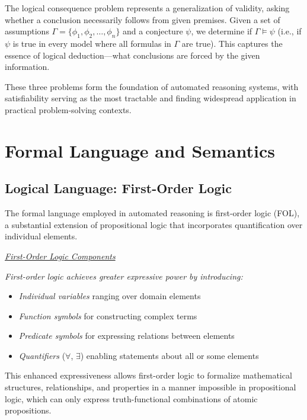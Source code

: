 \documentclass[11pt,a4paper]{article}
\theoremstyle{definition}
\theoremstyle{plain}
\theoremstyle{remark}
\begin{document}
The logical consequence problem represents a generalization of validity, asking whether a conclusion necessarily follows from given premises. Given a set of assumptions $\Gamma = \{\phi_1, \phi_2, \dots, \phi_n\}$ and a conjecture $\psi$, we determine if $\Gamma \models \psi$ (i.e., if $\psi$ is true in every model where all formulas in $\Gamma$ are true). This captures the essence of logical deduction---what conclusions are forced by the given information.

These three problems form the foundation of automated reasoning systems, with satisfiability serving as the most tractable and finding widespread application in practical problem-solving contexts. 


\section{Formal Language and Semantics}

\subsection{Logical Language: First-Order Logic}

The formal language employed in automated reasoning is first-order logic (FOL), a substantial extension of propositional logic that incorporates quantification over individual elements.

\begin{center}
\textit{\underline{First-Order Logic Components}}
\end{center}

\textit{First-order logic achieves greater expressive power by introducing:}
\begin{itemize}
    \item \textit{Individual variables} ranging over domain elements
    \item \textit{Function symbols} for constructing complex terms
    \item \textit{Predicate symbols} for expressing relations between elements
    \item \textit{Quantifiers} ($\forall$, $\exists$) enabling statements about all or some elements
\end{itemize}

This enhanced expressiveness allows first-order logic to formalize mathematical structures, relationships, and properties in a manner impossible in propositional logic, which can only express truth-functional combinations of atomic propositions.
\end{document}
